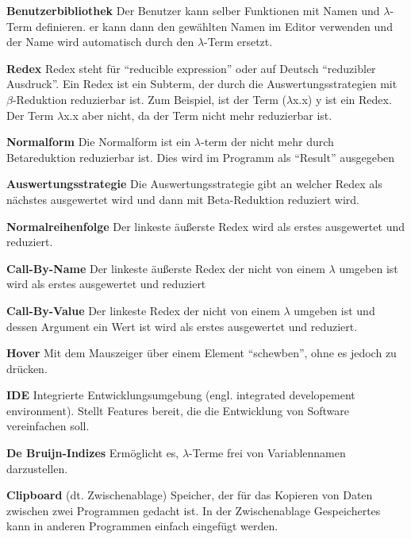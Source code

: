 \documentclass[parskip=full,11pt,twoside]{scrartcl}
\begin{document}
\textbf{Benutzerbibliothek}
\newline
Der Benutzer kann selber Funktionen mit Namen und $\lambda$-Term definieren. er kann dann den gewählten Namen im Editor verwenden und der Name wird automatisch durch den $\lambda$-Term ersetzt.

\textbf {Redex}
\newline
Redex steht für \enquote{reducible expression} oder auf Deutsch \enquote{reduzibler Ausdruck}. Ein Redex ist ein Subterm, der durch die Auswertungsstrategien mit $\beta$-Reduktion reduzierbar ist.
\newline
Zum Beispiel, ist der Term ($\lambda$x.x) y ist ein Redex. Der Term $\lambda$x.x aber nicht, da der Term nicht mehr reduzierbar ist.

\textbf{Normalform}
\newline
Die Normalform ist ein $\lambda$-term der nicht mehr durch Betareduktion reduzierbar ist. Dies wird im Programm als \enquote{Result} ausgegeben

\textbf{Auswertungsstrategie}
\newline
Die Auswertungsstrategie gibt an welcher Redex als nächstes ausgewertet wird und dann mit Beta-Reduktion reduziert wird.

\textbf{Normalreihenfolge}
\newline
Der linkeste äußerste Redex wird als erstes ausgewertet und reduziert.

\textbf{Call-By-Name}
\newline
Der linkeste äußerste Redex der nicht von einem $\lambda$ umgeben ist wird als erstes ausgewertet und reduziert

\textbf{Call-By-Value}
\newline
Der linkeste Redex der nicht von einem $\lambda$ umgeben ist und dessen Argument ein Wert ist wird als erstes ausgewertet und reduziert.

\textbf{Hover}
\newline
Mit dem Mauszeiger über einem Element \enquote{schewben}, ohne es jedoch zu drücken.

\textbf{IDE}
\newline
Integrierte Entwicklungsumgebung (engl. integrated developement environment). Stellt Features bereit, die die Entwicklung von Software vereinfachen soll.

\textbf{De Bruijn-Indizes}
\newline
Ermöglicht es, $\lambda$-Terme frei von Variablennamen darzustellen.

\textbf{Clipboard}
\newline
(dt. Zwischenablage) Speicher, der für das Kopieren von Daten zwischen zwei Programmen gedacht ist. In der Zwischenablage Gespeichertes kann in anderen Programmen einfach eingefügt werden.
\end{document}
